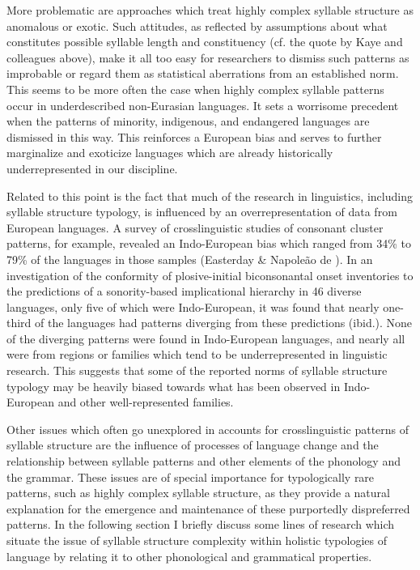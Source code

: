   More problematic are approaches which treat highly complex syllable structure as anomalous or exotic. Such attitudes, as reflected by assumptions about what constitutes possible syllable length and constituency (cf. the quote by Kaye and colleagues above), make it all too easy for researchers to dismiss such patterns as improbable or regard them as statistical aberrations from an established norm. This seems to be more often the case when highly complex syllable patterns occur in underdescribed non-Eurasian languages. It sets a worrisome precedent when the patterns of minority, indigenous, and endangered languages are dismissed in this way. This reinforces a European bias and serves to further marginalize and exoticize languages which are already historically underrepresented in our discipline.

  Related to this point is the fact that much of the research in linguistics, including syllable structure typology, is influenced by an overrepresentation of data from European languages. A survey of crosslinguistic studies of consonant cluster patterns, for example, revealed an Indo-European bias which ranged from 34\% \citep{Morelli1999} to 79\% \citep{Vennemann2012} of the languages in those samples (Easterday \& Napoleão de \citealt{Souza2015}). In an investigation of the conformity of plosive-initial biconsonantal onset inventories to the predictions of a sonority-based implicational hierarchy in 46 diverse languages, only five of which were Indo-European, it was found that nearly one-third of the languages had patterns diverging from these predictions (ibid.). None of the diverging patterns were found in Indo-European languages, and nearly all were from regions or families which tend to be underrepresented in linguistic research. This suggests that some of the reported norms of syllable structure typology may be heavily biased towards what has been observed in Indo-European and other well-represented families.

  Other issues which often go unexplored in accounts for crosslinguistic patterns of syllable structure are the influence of processes of language change and the relationship between syllable patterns and other elements of the phonology and the grammar. These issues are of special importance for typologically rare patterns, such as highly complex syllable structure, as they provide a natural explanation for the emergence and maintenance of these purportedly dispreferred patterns. In the following section I briefly discuss some lines of research which situate the issue of syllable structure complexity within holistic typologies of language by relating it to other phonological and grammatical properties.

